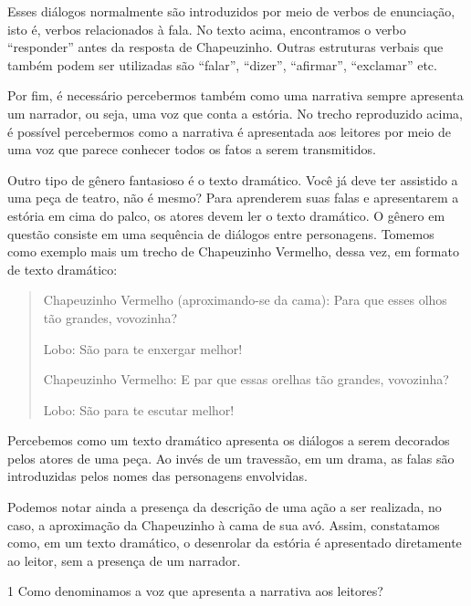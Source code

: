 {Esses diálogos normalmente são introduzidos por meio de verbos de
enunciação, isto é, verbos relacionados à fala. No texto acima,
encontramos o verbo ``responder'' antes da resposta de Chapeuzinho.
Outras estruturas verbais que também podem ser utilizadas são ``falar'',
``dizer'', ``afirmar'', ``exclamar'' etc.

Por fim, é necessário percebermos também como uma narrativa sempre
apresenta um narrador, ou seja, uma voz que conta a estória. No trecho
reproduzido acima, é possível percebermos como a narrativa é apresentada
aos leitores por meio de uma voz que parece conhecer todos os fatos a
serem transmitidos.

Outro tipo de gênero fantasioso é o texto dramático. Você já deve ter
assistido a uma peça de teatro, não é mesmo? Para aprenderem suas falas
e apresentarem a estória em cima do palco, os atores devem ler o texto
dramático. O gênero em questão consiste em uma sequência de diálogos
entre personagens. Tomemos como exemplo mais um trecho de Chapeuzinho
Vermelho, dessa vez, em formato de texto dramático:


\begin{quote}
Chapeuzinho Vermelho (aproximando-se da cama): Para que esses olhos
tão grandes, vovozinha?

Lobo: São para te enxergar melhor!

Chapeuzinho Vermelho: E par que essas orelhas tão grandes, vovozinha?

Lobo: São para te escutar melhor!
\end{quote}

Percebemos como um texto dramático apresenta os diálogos a serem
decorados pelos atores de uma peça. Ao invés de um travessão, em um
drama, as falas são introduzidas pelos nomes das personagens envolvidas.

Podemos notar ainda a presença da descrição de uma ação a ser realizada,
no caso, a aproximação da Chapeuzinho à cama de sua avó. Assim,
constatamos como, em um texto dramático, o desenrolar da estória é
apresentado diretamente ao leitor, sem a presença de um narrador.}


\num{1} Como denominamos a voz que apresenta a narrativa aos leitores?

